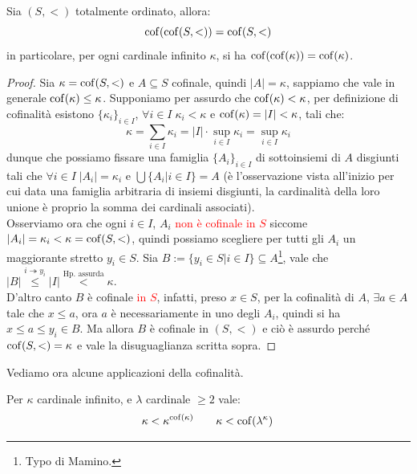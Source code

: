 \begin{remark}
	Sia $(S,<)$ totalmente ordinato, allora:
	\[ \operatorname{cof}(\operatorname{cof}(S,<)) = \operatorname{cof}(S,<)
		\]
	in particolare, per ogni cardinale infinito $\kappa$, si ha $\operatorname{cof}(\operatorname{cof}(\kappa)) = \operatorname{cof}(\kappa)$.
\end{remark}

\begin{proof}
	Sia $\kappa = \operatorname{cof}(S,<)$ e $A \subseteq S$ cofinale, quindi $|A| = \kappa$, sappiamo che vale in generale $\operatorname{cof}(\kappa) \leq \kappa$. Supponiamo per assurdo che $\operatorname{cof}(\kappa) < \kappa$,
	per definizione di cofinalit\`a esistono $\{\kappa_i\}_{i \in I}$, $\forall i \in I \; \kappa_i < \kappa$ e $\operatorname{cof}(\kappa) = |I| < \kappa$, tali che:
	\[ \kappa = \sum_{i \in I} \kappa_i = |I| \cdot \sup_{i \in I}\kappa_i = \sup_{i \in I}\kappa_i
		\]
	dunque che possiamo fissare una famiglia $\{A_i\}_{i \in I}$ di sottoinsiemi di $A$ disgiunti tali che $\forall i \in I \; |A_i| = \kappa_i$ e $\bigcup\{A_i | i \in I\} = A$ (\`e l'osservazione vista all'inizio per cui data una famiglia arbitraria di insiemi disgiunti, la cardinalit\`a della loro unione \`e proprio la somma dei cardinali associati).\\
	Osserviamo ora che ogni $i \in I$, $A_i$ \textcolor{red}{non \`e cofinale in $S$} siccome $|A_i| = \kappa_i < \kappa = \operatorname{cof}(S,<)$, quindi possiamo scegliere per tutti gli $A_i$ un maggiorante stretto $y_i \in S$.
	Sia $B := \{y_i \in S | i \in I\} \subseteq A$\footnote{Typo di Mamino.}, vale che $|B| \overset{i \twoheadrightarrow y_i}{\leq} |I| \overset{\text{Hp. assurda}}{<} \kappa$.\\
	D'altro canto $B$ \`e cofinale \textcolor{red}{in $S$}, infatti, preso $x \in S$, per la cofinalit\`a di $A$,
	$\exists a \in A$ tale che $x \leq a$, ora $a$ \`e necessariamente in uno degli $A_i$, quindi si ha $x \leq a \leq y_i \in B$.
	Ma allora $B$ \`e cofinale in $(S,<)$ e ci\`o \`e assurdo perch\'e $\operatorname{cof}(S,<) = \kappa$ e vale la disuguaglianza scritta sopra.
\end{proof}

Vediamo ora alcune applicazioni della cofinalit\`a.

\begin{corollary}
	Per $\kappa$ cardinale infinito, e $\lambda$ cardinale $\geq 2$ vale:
	\[ \kappa < \kappa^{\operatorname{cof}(\kappa)} \qquad \kappa < \operatorname{cof}(\lambda^{\kappa})\,
		\]
\end{corollary}

